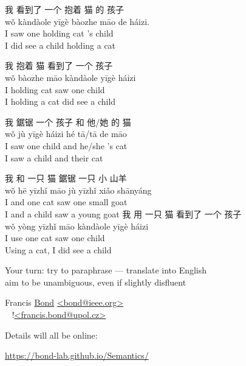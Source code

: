 \documentclass[a4paper,landscape,headrule,footrule,xetex,25pt]{foils}
\begin{document}
\begin{exe}
  \ex \glll 我 看到了 一个 抱着 猫 的 孩子 \\
  wǒ   kàndàole    yīgè   bàozhe  māo  de    háizi. \\
  I saw one holding cat 's child \\
  \trans I did see a child holding a cat

  \ex \glll 我 抱着 猫 看到了 一个 孩子 \\
  wǒ  bàozhe māo kàndàole  yīgè     háizi \\
  I holding cat saw one  child \\
 \trans I holding a cat did see a child

  \ex \glll 我 鋸锯  一个 孩子 和 他/她 的 猫 \\
wǒ jù  yīgè    háizi  hé  tā/tā   de māo \\
 I      saw    one    child   and     he/she  's cat\\
 \trans I saw  a child and their cat 

  \ex \glll 我 和 一只 猫 鋸锯 一只 小 山羊 \\
wǒ hē  yīzhǐ  māo jù yīzhǐ xiǎo  shānyáng  \\
I and one cat saw one small goat \\

\trans I and a child saw a young goat
  \ex \glll 我 用 一只 猫 看到了 一个 孩子 \\
wǒ yòng yīzhǐ  māo kàndàole  yīgè  háizi \\
I use one cat saw one child \\
\trans Using a cat, I did see a child
\end{exe}

\bigskip
\begin{center} \large
  Your turn: try to paraphrase --- translate into English
  \\ aim to be unambiguous, even if slightly disfluent\task
\end{center}




\begin{description}\addtolength{\itemsep}{-5mm}
\item [Coordinator]  Francis \ul{Bond} 
  {\small \url{<bond@ieee.org>}
    \\ ~ \hfill !\url{<francis.bond@upol.cz>}}
\item Details will all be  online:
  \begin{center}
    \url{https://bond-lab.github.io/Semantics/}    
  \end{center}
\end{description}
\end{document}
